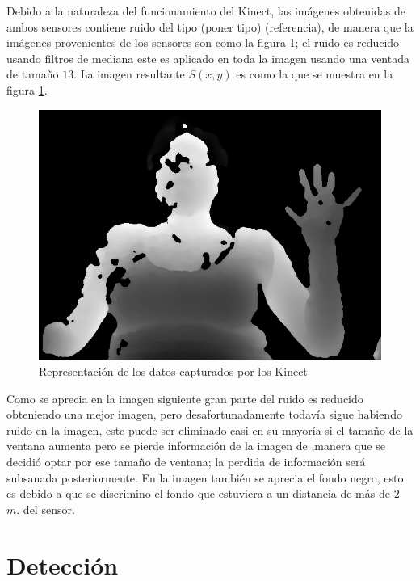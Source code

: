 Debido a la naturaleza del funcionamiento del Kinect, las imágenes obtenidas de ambos sensores contiene ruido del tipo (poner tipo) (referencia), de manera que la imágenes provenientes de los sensores son como la figura \ref{fig:ImagenCapturadaNoNoise}; el ruido  es reducido usando filtros de mediana este es aplicado en toda la imagen usando una ventada de tamaño $13$. La imagen resultante $S(x,y)$ es como la que se muestra en la figura \ref{fig:ImagenCapturadaNoNoise}.\\ 
\begin{figure}[h!]
\begin{center}
\includegraphics[scale=.5]{./Figures/166_W13.png}
\end{center}
\caption{Representación de los datos capturados por los Kinect}
\label{fig:ImagenCapturadaNoNoise}
\end{figure}  
Como se aprecia en la imagen siguiente gran parte del ruido es reducido obteniendo una mejor imagen, pero desafortunadamente todavía sigue habiendo ruido en la imagen, este puede ser eliminado casi en su mayoría  si el tamaño de la ventana aumenta pero se pierde información de la imagen de ,manera que se decidió optar por ese tamaño de ventana; la perdida de información será subsanada posteriormente. En la imagen también se aprecia el fondo negro, esto es debido a que se discrimino el fondo que estuviera a un distancia de más de $2$ $m.$ del sensor. 



\section{Detección}\label{sec:DeteccionSystem} 

